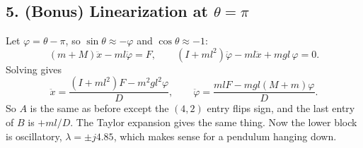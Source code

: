 \subsection*{5. (Bonus) Linearization at $\theta=\pi$}

Let $\varphi=\theta-\pi$, so $\sin\theta\approx-\varphi$ and $\cos\theta\approx-1$:
\[
(m+M)\ddot x-ml\ddot\varphi=F,\qquad (I+ml^2)\ddot\varphi-ml\ddot x+mgl\,\varphi=0 .
\]
Solving gives
\[
\ddot x=\frac{(I+ml^2)F-m^2gl^2\varphi}{D},\qquad
\ddot\varphi=\frac{mlF-mgl(M+m)\varphi}{D}.
\]
So $A$ is the same as before except the $(4,2)$ entry flips sign, and the last entry of $B$ is $+ml/D$. The Taylor expansion gives the same thing. Now the lower block is oscillatory, $\lambda=\pm j4.85$, which makes sense for a pendulum hanging down.
